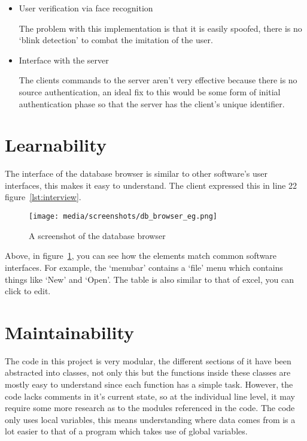 \documentclass[12pt,a4paper]{report}
\begin{document}
		\begin{itemize}
			\item User verification via face recognition

			The problem with this implementation is that it is easily spoofed, there is no `blink detection' to combat the imitation of the user. 

			\item Interface with the server

			The clients commands to the server aren't very effective because there is no source authentication, an ideal fix to this would be some form of
			initial authentication phase so that the server has the client's unique identifier.
		\end{itemize}


\section{Learnability}
	The interface of the database browser is similar to other software's user interfaces, this makes it easy to understand. The client expressed this in
	line 22 figure~\ref{lst:interview}.

	\begin{figure}
		\begin{center}
		\caption{A screenshot of the database browser}
		\label{fig:db_browser}
		\texttt{[image: media/screenshots/db\_browser\_eg.png]}
		\end{center}
	\end{figure}

	Above, in figure~\ref{fig:db_browser}, you can see how the elements match common software interfaces. For example, the `menubar' contains a `file'
	menu which contains things like `New' and `Open'. The table is also similar to that of excel, you can click to edit. 


\section{Maintainability}

	The code in this project is very modular, the different sections of it have been abstracted into classes, not only this but the functions inside these
	classes are mostly easy to understand since each function has a simple task. However, the code lacks comments in it's current state, so at the individual
	line level, it may require some more research as to the modules referenced in the code. The code only uses local variables, this means understanding where
	data comes from is a lot easier to that of a program which takes use of global variables.
\end{document}
